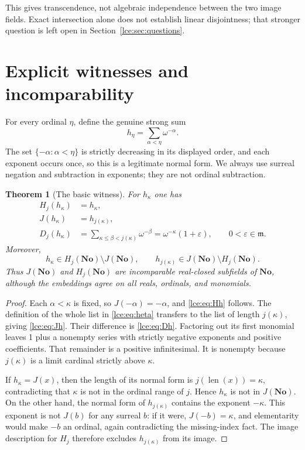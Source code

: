 \documentclass[11pt,letterpaper]{article}
\numberwithin{equation}{section}
\newtheorem{theorem}{Theorem}[section]
\theoremstyle{definition}
\theoremstyle{remark}
\newcommand{\No}{\mathbf{No}}
\newcommand{\len}{\operatorname{len}}
\newcommand{\eps}{\varepsilon}
\newcommand{\infideal}{\mathfrak m}
\begin{document}
This gives transcendence, not algebraic independence between the two image
fields. Exact intersection alone does not establish linear disjointness;
that stronger question is left open in Section~\ref{lce:sec:questions}.

\section{Explicit witnesses and incomparability}\label{lce:sec:witness}

For every ordinal $\eta$, define the genuine strong sum
\begin{equation}\label{lce:eq:heta}
 h_\eta=\sum_{\alpha<\eta}\omega^{-\alpha}.
\end{equation}
The set $\{-\alpha:\alpha<\eta\}$ is strictly decreasing in its displayed
order, and each exponent occurs once, so this is a legitimate normal form.
We always use surreal negation and subtraction in exponents; they are not
ordinal subtraction.

\begin{theorem}[The basic witness]\label{lce:thm:witness}
For $h_\kappa$ one has
\begin{align}
 H_j(h_\kappa)&=h_\kappa,\label{lce:eq:Hh}\\
 J(h_\kappa)&=h_{j(\kappa)},\label{lce:eq:Jh}\\
 D_j(h_\kappa)&=
  \sum_{\kappa\le\beta<j(\kappa)}\omega^{-\beta}
  =\omega^{-\kappa}(1+\eps),\qquad 0<\eps\in\infideal.
  \label{lce:eq:Dh}
\end{align}
Moreover,
\[
 h_\kappa\in H_j(\No)\setminus J(\No),\qquad
 h_{j(\kappa)}\in J(\No)\setminus H_j(\No).
\]
Thus $J(\No)$ and $H_j(\No)$ are incomparable real-closed subfields of
$\No$, although the embeddings agree on all reals, ordinals, and monomials.
\end{theorem}
\begin{proof}
Each $\alpha<\kappa$ is fixed, so $J(-\alpha)=-\alpha$, and
\eqref{lce:eq:Hh} follows. The definition of the whole list in
\eqref{lce:eq:heta} transfers to the list of length $j(\kappa)$, giving
\eqref{lce:eq:Jh}. Their difference is \eqref{lce:eq:Dh}. Factoring out its first
monomial leaves 1 plus a nonempty series with strictly negative exponents
and positive coefficients. That remainder is a positive infinitesimal.
It is nonempty because $j(\kappa)$ is a limit cardinal strictly above
$\kappa$.

If $h_\kappa=J(x)$, then the length of its normal form is
$j(\len(x))=\kappa$, contradicting that $\kappa$ is not in the ordinal
range of $j$. Hence $h_\kappa$ is not in $J(\No)$.
On the other hand, the normal form of $h_{j(\kappa)}$ contains the exponent
$-\kappa$. This exponent is not $J(b)$ for any surreal $b$: if it were,
$J(-b)=\kappa$, and elementarity would make $-b$ an ordinal, again
contradicting the missing-index fact. The image description for $H_j$
therefore excludes $h_{j(\kappa)}$ from its image.
\end{proof}
\end{document}
